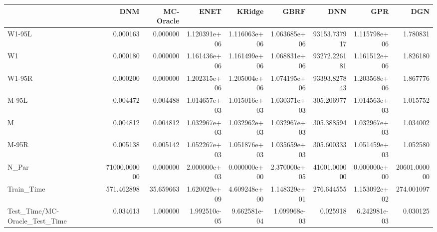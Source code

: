 \begin{tabular}{lrrrrrrrr}
\toprule
{} &           DNM &  MC-Oracle &          ENET &        KRidge &          GBRF &           DNN &           GPR &           DGN \\
\midrule
W1-95L                        &      0.000163 &   0.000000 &  1.120391e+06 &  1.116063e+06 &  1.063685e+06 &  93153.737917 &  1.115798e+06 &      1.780831 \\
W1                            &      0.000180 &   0.000000 &  1.161436e+06 &  1.161499e+06 &  1.068831e+06 &  93272.226181 &  1.161512e+06 &      1.826180 \\
W1-95R                        &      0.000200 &   0.000000 &  1.202315e+06 &  1.205004e+06 &  1.074195e+06 &  93393.827843 &  1.203568e+06 &      1.867776 \\
M-95L                         &      0.004472 &   0.004488 &  1.014657e+03 &  1.015016e+03 &  1.030371e+03 &    305.206977 &  1.014563e+03 &      1.015752 \\
M                             &      0.004812 &   0.004812 &  1.032967e+03 &  1.032962e+03 &  1.032967e+03 &    305.388594 &  1.032967e+03 &      1.034002 \\
M-95R                         &      0.005138 &   0.005142 &  1.052267e+03 &  1.051876e+03 &  1.035659e+03 &    305.600333 &  1.051459e+03 &      1.052580 \\
N\_Par                         &  71000.000000 &   0.000000 &  2.000000e+03 &  0.000000e+00 &  2.370000e+05 &  41001.000000 &  0.000000e+00 &  20601.000000 \\
Train\_Time                    &    571.462898 &  35.659663 &  1.620029e+09 &  4.609248e+00 &  1.148329e+01 &    276.644555 &  1.153092e+02 &    274.001097 \\
Test\_Time/MC-Oracle\_Test\_Time &      0.034613 &   1.000000 &  1.992510e-05 &  9.662581e-04 &  1.099968e-03 &      0.025918 &  6.242981e-03 &      0.030125 \\
\bottomrule
\end{tabular}

